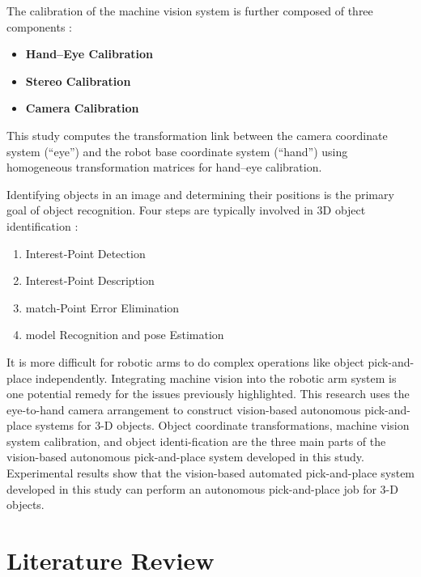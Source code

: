 \documentclass[12pt]{article}
\begin{document}
The calibration of the machine vision system is further composed of three components \cite{ref12}:
\begin{itemize}
  \item \textbf{Hand–Eye Calibration}
  \item \textbf{Stereo Calibration}
  \item \textbf{Camera Calibration}
\end{itemize}

This study computes the transformation link between the camera coordinate system (``eye'') and the robot base coordinate system (``hand'') using homogeneous transformation matrices for hand–eye calibration\cite{ref12}.

Identifying objects in an image and determining their positions is the primary goal of object recognition. Four steps are typically involved in 3D object identification \cite{ref12}:
\begin{enumerate}
  \item Interest‑Point Detection \cite{ref12}
  \item Interest‑Point Description \cite{ref12}
  \item match‑Point Error Elimination \cite{ref12}
  \item model Recognition and pose Estimation \cite{ref12}
\end{enumerate}
It is more difficult for robotic arms to do complex operations like object pick-and-place independently.  Integrating machine vision into the robotic arm system is one potential remedy for the issues previously highlighted. This research uses the eye-to-hand camera arrangement to construct vision-based autonomous pick-and-place systems for 3-D objects. Object coordinate transformations, machine vision system calibration, and object identi-fication are the three main parts of the vision-based autonomous pick-and-place system developed in this study.   Experimental results show that the vision-based automated pick-and-place system developed in this study can perform an autonomous pick-and-place job for 3-D objects\cite{ref12}.
\newpage

\section{Literature Review}
\end{document}
